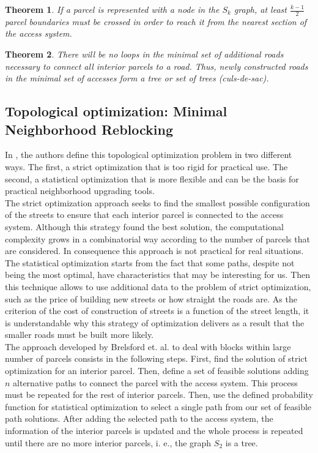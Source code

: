 \documentclass[10pt]{article}
\newtheorem{theorem}{Theorem}
\begin{document}
\begin{theorem}
    If a parcel is represented with a node in the $S_k$ graph, at least $\frac{k-1}{2}$ parcel boundaries must be crossed in order to reach it from the nearest section of the access system.
\end{theorem}

\begin{theorem}
    There will be no loops in the minimal set of additional roads necessary to connect all interior parcels to a road. Thus, newly constructed roads in the minimal set of accesses form a tree or set of trees (culs-de-sac).
\end{theorem}

\subsection{Topological optimization: Minimal Neighborhood Reblocking}

 In \cite{bre}, the authors define this topological optimization problem in two different ways. The first, a strict optimization that is too rigid for practical use. The second, a statistical optimization that is more flexible and can be the basis for practical neighborhood upgrading tools.\\

The strict optimization approach seeks to find the smallest possible configuration of the streets to ensure that each interior parcel is connected to the access system. Although this strategy found the best solution, the computational complexity grows in a combinatorial way according to the number of parcels that are considered. In consequence this approach is not practical for real situations.\\

The statistical optimization starts from the fact that some paths, despite not being the most optimal, have characteristics that may be interesting for us. Then this technique allows to use additional data to the problem of strict optimization, such as the price of building new streets or how straight the roads are. As the criterion of the cost of construction of streets is a function of the street length, it is understandable why this strategy of optimization delivers as a result that the smaller roads must be built more likely.\\

The approach developed by Brelsford et. al. to deal with blocks within large number of parcels consists in the following steps. First, find the solution of strict optimization for an interior parcel. Then, define a set of feasible solutions adding $n$ alternative paths to connect the parcel with the access system. This process must be repeated for the rest of interior parcels. Then, use the defined probability function for statistical optimization to select a single path from our set of feasible path solutions. After adding the selected path to the access system, the information of the interior parcels is updated and the whole process is repeated until there are no more interior parcels, i. e., the graph $ S_2 $ is a tree.
\end{document}
